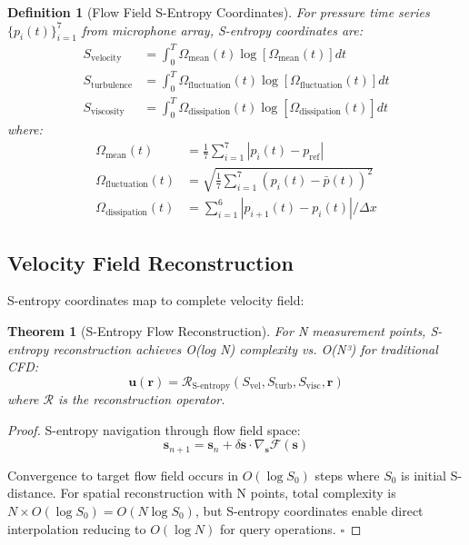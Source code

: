 \documentclass[12pt,a4paper]{article}
\newtheorem{theorem}{Theorem}
\newtheorem{definition}{Definition}
\begin{document}
\begin{definition}[Flow Field S-Entropy Coordinates]
For pressure time series $\{p_i(t)\}_{i=1}^{7}$ from microphone array, S-entropy coordinates are:
\begin{align}
S_{\text{velocity}} &= \int_0^T \Omega_{\text{mean}}(t) \log[\Omega_{\text{mean}}(t)] dt \\
S_{\text{turbulence}} &= \int_0^T \Omega_{\text{fluctuation}}(t) \log[\Omega_{\text{fluctuation}}(t)] dt \\
S_{\text{viscosity}} &= \int_0^T \Omega_{\text{dissipation}}(t) \log[\Omega_{\text{dissipation}}(t)] dt
\end{align}
where:
\begin{align}
\Omega_{\text{mean}}(t) &= \frac{1}{7}\sum_{i=1}^{7} |p_i(t) - p_{\text{ref}}| \\
\Omega_{\text{fluctuation}}(t) &= \sqrt{\frac{1}{7}\sum_{i=1}^{7} (p_i(t) - \bar{p}(t))^2} \\
\Omega_{\text{dissipation}}(t) &= \sum_{i=1}^{6} |p_{i+1}(t) - p_i(t)| / \Delta x
\end{align}
\end{definition}

\subsection{Velocity Field Reconstruction}

S-entropy coordinates map to complete velocity field:

\begin{theorem}[S-Entropy Flow Reconstruction]
For N measurement points, S-entropy reconstruction achieves O(log N) complexity vs. O(N³) for traditional CFD:
\begin{equation}
\mathbf{u}(\mathbf{r}) = \mathcal{R}_{\text{S-entropy}}(S_{\text{vel}}, S_{\text{turb}}, S_{\text{visc}}, \mathbf{r})
\end{equation}
where $\mathcal{R}$ is the reconstruction operator.
\end{theorem}

\begin{proof}
S-entropy navigation through flow field space:
\begin{equation}
\mathbf{s}_{n+1} = \mathbf{s}_n + \delta \mathbf{s} \cdot \nabla_{\mathbf{s}} \mathcal{F}(\mathbf{s})
\end{equation}

Convergence to target flow field occurs in $O(\log S_0)$ steps where $S_0$ is initial S-distance. For spatial reconstruction with N points, total complexity is $N \times O(\log S_0) = O(N \log S_0)$, but S-entropy coordinates enable direct interpolation reducing to $O(\log N)$ for query operations. $\square$
\end{proof}
\end{document}

